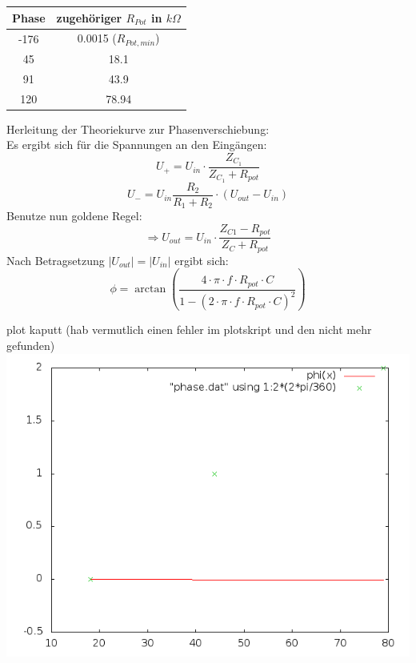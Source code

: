 \documentclass[compress,11pt]{beamer}
\begin{document}
\begin{frame}
\begin{tabular}{|c|c|}
\hline
Phase & zugehöriger $R_{Pot}$ in $k \Omega$  \\
\hline
    -176 & 0.0015 ($R_{Pot,min}$) \\
    45 & 18.1 \\
    91 & 43.9 \\
	120 & 78.94 \\
	
	
\hline
\end{tabular}

\end{frame}
\begin{frame}
Herleitung der Theoriekurve zur Phasenverschiebung:\\
Es ergibt sich für die Spannungen an den Eingängen:
\begin{equation}
U_{+} = U_{in} \cdot \frac{Z_{C_1}}{Z_{C_1} + R_{pot}}
\end{equation}
\begin{equation}
U_{-} = U_{in} \frac{R_2}{R_1 + R_2} \cdot (U_{out} - U_{in})
\end{equation}
Benutze nun goldene Regel:
\begin{equation}
\Rightarrow U_{out} = U_{in} \cdot \frac{Z_{C1} - R_{pot}}{Z_{C} + R_{pot}}
\end{equation}
Nach Betragsetzung $|U_{out}| = |U_{in}|$ ergibt sich:
\begin{equation}
\phi = \arctan (\frac{4 \cdot \pi \cdot f \cdot R_{pot} \cdot C }{1 - (2 \cdot \pi \cdot f \cdot R_{pot} \cdot C)^2})
\end{equation}
\end{frame}
\begin{frame}
plot kaputt (hab vermutlich einen fehler im plotskript und den nicht mehr gefunden)\\
\includegraphics[width=.7\textwidth]{../phase}
\end{frame}
\end{document}
